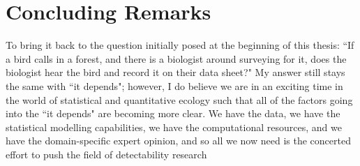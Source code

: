 \section{Concluding Remarks}
\par To bring it back to the question initially posed at the beginning of this thesis: ``If a bird calls in a forest, and there is a biologist around surveying for it, does the biologist hear the bird and record it on their data sheet?"
My answer still stays the same with ``it depends"; however, I do believe we are in an exciting time in the world of statistical and quantitative ecology such that all of the factors going into the ``it depends" are becoming more clear.
We have the data, we have the statistical modelling capabilities, we have the computational resources, and we have the domain-specific expert opinion, and so all we now need is the concerted effort to push the field of detectability research

